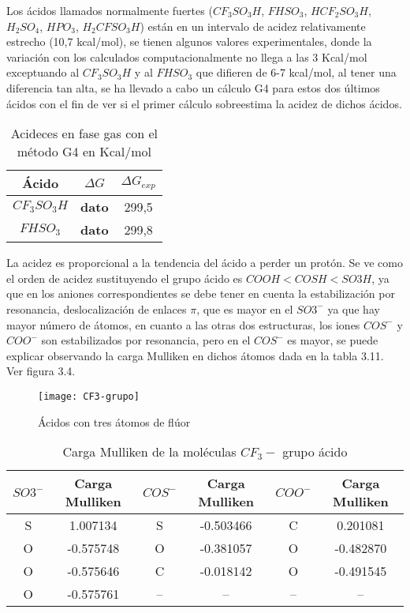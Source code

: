 Los ácidos llamados normalmente fuertes ($ CF_3SO_3H$, $FHSO_3$, $HCF_2SO_3H$, $H_2SO_4$, $HPO_3$, $H_2CFSO_3H$) están en un intervalo de acidez relativamente estrecho (10,7 kcal/mol), se tienen algunos valores experimentales, donde la variación con los calculados computacionalmente no llega a las 3 Kcal/mol exceptuando al $CF_3SO_3H$ y al $FHSO_3$ que difieren de 6-7 kcal/mol, al tener una diferencia tan alta, se ha llevado a cabo un cálculo G4 para estos dos últimos ácidos con el fin de ver si el primer cálculo sobreestima la acidez de dichos ácidos. 
\begin{table}[H]
	\centering
	\begin{tabular}{|c|c|c|}
		\hline
		Ácido & $\Delta G$ & $\Delta G_{exp}$ \\ \hline
		$CF_3SO_3H$ &{\bfseries dato }& 299,5 \\ \hline
		$FHSO_3$ & {\bfseries dato } & 299,8 \\ \hline 
	\end{tabular}
\caption{Acideces en fase gas con el método G4 en Kcal/mol}
\end{table}

La acidez es proporcional a la tendencia del ácido a perder un protón. Se ve como el orden de acidez sustituyendo el grupo ácido es $ COOH {<} COSH {<} SO3H $, ya que en los aniones correspondientes se debe tener en cuenta la estabilización por resonancia, deslocalización de enlaces $\pi$, que es mayor en el $SO3^-$ ya que hay mayor número de átomos, en cuanto a las otras dos estructuras, los iones $COS^-$ y $COO^-$ son estabilizados por resonancia, pero en el $COS^-$ es mayor, se puede explicar observando la carga Mulliken en dichos átomos dada en la tabla 3.11. Ver figura 3.4.

\begin{figure}[H]
	\centering
	\texttt{[image: CF3-grupo]}
	\caption{Ácidos con tres átomos de flúor}
\end{figure}

\begin{table}[H]
    \centering
    \begin{tabular}{|c|c|c|c|c|c|}
    \hline
    $SO3^-$ & Carga Mulliken &$COS^-$ & Carga Mulliken & $COO^-$ & Carga Mulliken \\ \hline
    S & 1.007134 & S & -0.503466 & C & 0.201081 \\ \hline
    O & -0.575748 & O & -0.381057 & O & -0.482870 \\ \hline
    O & -0.575646 & C & -0.018142 & O & -0.491545 \\ \hline
    O & -0.575761 & -- & -- & -- & -- \\ \hline
    \end{tabular}
    \caption{Carga Mulliken de la moléculas $CF_3-$ grupo ácido}
\end{table}

